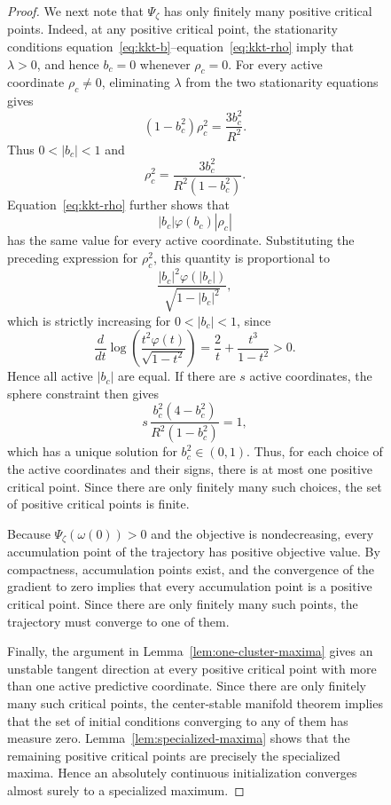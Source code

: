 \documentclass{article}
\def\eqref#1{equation~\ref{#1}}
\newcounter{initialization}[section]
\begin{document}
\begin{figure}
\begin{proof}
We next note that $\Psi_\zeta$ has only finitely many positive critical
points. Indeed, at any positive critical point, the stationarity conditions
\eqref{eq:kkt-b}--\eqref{eq:kkt-rho} imply that $\lambda>0$, and hence
$b_c=0$ whenever $\rho_c=0$. For every active coordinate $\rho_c\neq0$,
eliminating $\lambda$ from the two stationarity equations gives
\[
    (1-b_c^2)\rho_c^2
    =
    \frac{3b_c^2}{R^2}.
\]
Thus $0<|b_c|<1$ and
\[
    \rho_c^2
    =
    \frac{3b_c^2}{R^2(1-b_c^2)}.
\]
Equation~\ref{eq:kkt-rho} further shows that
\[
    |b_c|\varphi(b_c)|\rho_c|
\]
has the same value for every active coordinate. Substituting the preceding
expression for $\rho_c^2$, this quantity is proportional to
\[
    \frac{|b_c|^2\varphi(|b_c|)}
         {\sqrt{1-|b_c|^2}},
\]
which is strictly increasing for $0<|b_c|<1$, since
\[
    \frac{d}{dt}
    \log\left(
        \frac{t^2\varphi(t)}{\sqrt{1-t^2}}
    \right)
    =
    \frac{2}{t}+\frac{t^3}{1-t^2}
    >0.
\]
Hence all active $|b_c|$ are equal. If there are $s$ active coordinates,
the sphere constraint then gives
\[
    s\,\frac{b_c^2(4-b_c^2)}
             {R^2(1-b_c^2)}
    =1,
\]
which has a unique solution for $b_c^2\in(0,1)$. Thus, for each choice of
the active coordinates and their signs, there is at most one positive
critical point. Since there are only finitely many such choices, the set of
positive critical points is finite.

Because $\Psi_\zeta({\omega(0)})>0$ and the objective is nondecreasing, every
accumulation point of the trajectory has positive objective value. By
compactness, accumulation points exist, and the convergence of the gradient
to zero implies that every accumulation point is a positive critical point.
Since there are only finitely many such points, the trajectory must converge
to one of them.

Finally, the argument in Lemma~\ref{lem:one-cluster-maxima} gives an
unstable tangent direction at every positive critical point with more than
one active predictive coordinate. Since there are only finitely many such
critical points, the center-stable manifold theorem implies that the set of
initial conditions converging to any of them has measure zero.
Lemma~\ref{lem:specialized-maxima} shows that the remaining positive critical
points are precisely the specialized maxima. Hence an absolutely continuous
initialization converges almost surely to a specialized maximum.
\end{proof}


\end{figure}
\end{document}
